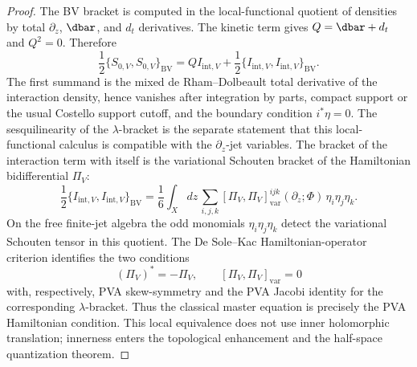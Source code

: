 \begin{proof}
The BV bracket is computed in the local-functional quotient of
densities by total $\partial_z$, $\dbar$, and $d_t$ derivatives.
The kinetic term gives $Q=\dbar+d_t$ and $Q^2=0$. Therefore
\[
\frac12\{S_{0,V},S_{0,V}\}_{\mathrm{BV}}
 =
 QI_{\mathrm{int},V}
 +\frac12\{I_{\mathrm{int},V},I_{\mathrm{int},V}\}_{\mathrm{BV}} .
\]
The first summand is the mixed de Rham--Dolbeault total derivative of
the interaction density, hence vanishes after integration by parts,
compact support or the usual Costello support cutoff, and the boundary
condition $i^*\eta=0$. The sesquilinearity of the
$\lambda$-bracket is the separate statement that this local-functional
calculus is compatible with the $\partial_z$-jet variables.
The bracket of the interaction term with itself is the variational
Schouten bracket of the Hamiltonian bidifferential
$\Pi_V$:
\[
\frac12\{I_{\mathrm{int},V},I_{\mathrm{int},V}\}_{\mathrm{BV}}
=
\frac16\int_X dz\,
\sum_{i,j,k}
[\Pi_V,\Pi_V]^{ijk}_{\mathrm{var}}
(\partial_z;\Phi)\,\eta_i\eta_j\eta_k .
\]
On the free finite-jet algebra the odd monomials
$\eta_i\eta_j\eta_k$ detect the variational Schouten tensor in this
quotient. The De Sole--Kac Hamiltonian-operator criterion identifies
the two conditions
\[
(\Pi_V)^*=-\Pi_V,
\qquad
[\Pi_V,\Pi_V]_{\mathrm{var}}=0
\]
with, respectively, PVA skew-symmetry and the PVA Jacobi identity for
the corresponding $\lambda$-bracket. Thus the classical master
equation is precisely the PVA Hamiltonian condition. This local
equivalence does not use inner holomorphic translation; innerness
enters the topological enhancement and the half-space quantization
theorem.
\end{proof}

